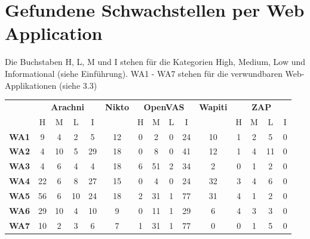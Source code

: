 \documentclass[12pt,oneside,a4paper,parskip]{scrbook}
\begin{document}
  \section{Gefundene Schwachstellen per Web Application}
  Die Buchstaben H, L, M und I stehen für die Kategorien High, Medium, Low und Informational (siehe Einführung). WA1 - WA7 stehen für die verwundbaren Web-Applikationen (siehe 3.3)
    \begin{table}[H]
      \centering
      \begin{tabular}{|r|c|c|c|c|c|c|c|c|c|c|c|c|c|c|}
        \cline{2-15}
        \multicolumn{1}{r|}{}       & \multicolumn{4}{c|}{\textbf{Arachni}} & \textbf{Nikto} & \multicolumn{4}{c|}{\textbf{OpenVAS}} & \textbf{Wapiti} & \multicolumn{4}{c|}{\textbf{ZAP}}  \\
        \cline{2-15}
        \multicolumn{1}{r|}{}       & H & M & L & I              &                & H & M & L & I              &                 & H & M & L & I                        \\
        \hline
        \textbf{WA1}      & 9    & 4    & 2   & 5                 & 12             & 0    & 2    & 0   & 24                & 10              & 1    & 2    & 5   & 0                           \\
        \hline
        \textbf{WA2}        & 4    & 10   & 5   & 29                & 18             & 0    & 8    & 0   & 41                & 12              & 1    & 4    & 11  & 0                           \\
        \hline
        \textbf{WA3}          & 4    & 6    & 4   & 4                 & 18             & 6    & 51   & 2   & 34                & 2               & 0    & 1    & 2   & 0                           \\
        \hline
        \textbf{WA4}    & 22   & 6    & 8   & 27                & 15             & 0    & 4    & 0   & 24                & 32              & 3    & 4    & 6   & 0                           \\
        \hline
        \textbf{WA5}             & 56   & 6    & 10  & 24                & 18             & 2    & 31   & 1   & 77                & 31              & 4    & 1    & 2   & 0                           \\
        \hline
        \textbf{WA6}      & 29   & 10   & 4   & 10                & 9              & 0    & 11   & 1   & 29                & 6               & 4    & 3    & 3   & 0                           \\
        \hline
        \textbf{WA7}    & 10   & 2    & 3   & 6                 & 7              & 1    & 31   & 1   & 77                & 0               & 0    & 1    & 5   & 0                           \\

\end{tabular}
\end{table}
\end{document}
